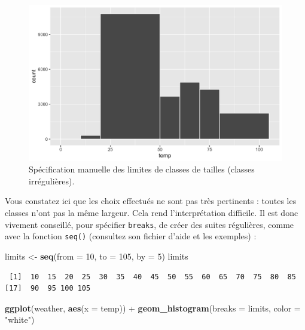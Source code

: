 \documentclass[a4paperpaper,]{article}
\newenvironment{Shaded}{\begin{snugshade}}{\end{snugshade}}
\newcommand{\DataTypeTok}[1]{\textcolor[rgb]{0.00,0.34,0.68}{#1}}
\newcommand{\DecValTok}[1]{\textcolor[rgb]{0.69,0.50,0.00}{#1}}
\newcommand{\KeywordTok}[1]{\textcolor[rgb]{0.12,0.11,0.11}{\textbf{#1}}}
\newcommand{\NormalTok}[1]{\textcolor[rgb]{0.12,0.11,0.11}{#1}}
\newcommand{\OperatorTok}[1]{\textcolor[rgb]{0.12,0.11,0.11}{#1}}
\newcommand{\StringTok}[1]{\textcolor[rgb]{0.75,0.01,0.01}{#1}}
\begin{document}
\begin{figure}[htpb]

{\centering \includegraphics[width=0.9\linewidth]{figure/irregclasses-1} 

}

\caption{Spécification manuelle des limites de classes de tailles (classes irrégulières).}\label{fig:irregclasses}
\end{figure}

Vous constatez ici que les choix effectués ne sont pas très pertinents : toutes les classes n'ont pas la même largeur. Cela rend l'interprétation difficile. Il est donc vivement conseillé, pour spécifier \texttt{breaks}, de créer des suites régulières, comme avec la fonction \texttt{seq()} (consultez son fichier d'aide et les exemples) :

\begin{Shaded}
\begin{Highlighting}[]
\NormalTok{limits <-}\StringTok{ }\KeywordTok{seq}\NormalTok{(}\DataTypeTok{from =} \DecValTok{10}\NormalTok{, }\DataTypeTok{to =} \DecValTok{105}\NormalTok{, }\DataTypeTok{by =} \DecValTok{5}\NormalTok{)}
\NormalTok{limits}
\end{Highlighting}
\end{Shaded}

\begin{verbatim}
 [1]  10  15  20  25  30  35  40  45  50  55  60  65  70  75  80  85
[17]  90  95 100 105
\end{verbatim}

\begin{Shaded}
\begin{Highlighting}[]
\KeywordTok{ggplot}\NormalTok{(weather, }\KeywordTok{aes}\NormalTok{(}\DataTypeTok{x =}\NormalTok{ temp)) }\OperatorTok{+}
\StringTok{  }\KeywordTok{geom_histogram}\NormalTok{(}\DataTypeTok{breaks =}\NormalTok{ limits, }\DataTypeTok{color =} \StringTok{"white"}\NormalTok{)}
\end{Highlighting}
\end{Shaded}
\end{document}
